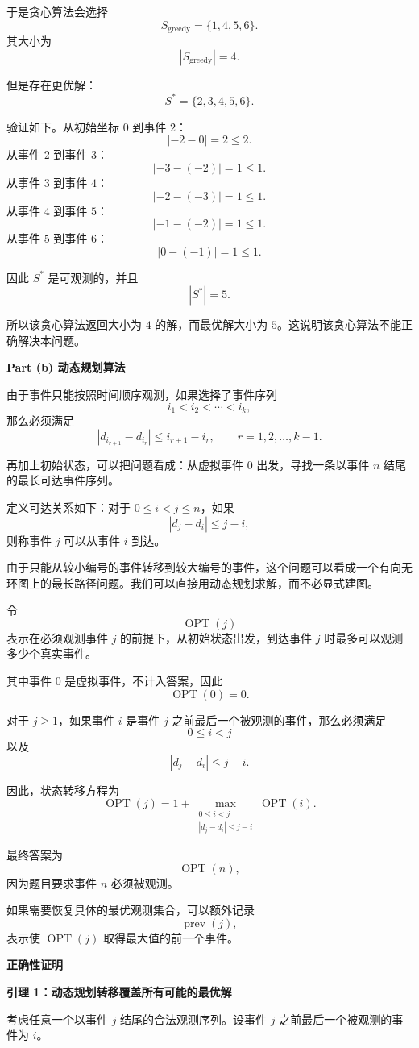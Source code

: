 \documentclass[12pt,a4paper]{article}
\begin{document}
\begin{answerbox}
于是贪心算法会选择
\[
S_{\text{greedy}}=\{1,4,5,6\}.
\]
其大小为
\[
|S_{\text{greedy}}|=4.
\]

但是存在更优解：
\[
S^*=\{2,3,4,5,6\}.
\]

验证如下。从初始坐标 $0$ 到事件 $2$：
\[
|-2-0|=2\le 2.
\]
从事件 $2$ 到事件 $3$：
\[
|-3-(-2)|=1\le 1.
\]
从事件 $3$ 到事件 $4$：
\[
|-2-(-3)|=1\le 1.
\]
从事件 $4$ 到事件 $5$：
\[
|-1-(-2)|=1\le 1.
\]
从事件 $5$ 到事件 $6$：
\[
|0-(-1)|=1\le 1.
\]

因此 $S^*$ 是可观测的，并且
\[
|S^*|=5.
\]

所以该贪心算法返回大小为 $4$ 的解，而最优解大小为 $5$。这说明该贪心算法不能正确解决本问题。

\textbf{Part (b) 动态规划算法}

由于事件只能按照时间顺序观测，如果选择了事件序列
\[
i_1<i_2<\cdots<i_k,
\]
那么必须满足
\[
|d_{i_{r+1}}-d_{i_r}|\le i_{r+1}-i_r,
\qquad r=1,2,\ldots,k-1.
\]

再加上初始状态，可以把问题看成：从虚拟事件 $0$ 出发，寻找一条以事件 $n$ 结尾的最长可达事件序列。

定义可达关系如下：对于 $0\le i<j\le n$，如果
\[
|d_j-d_i|\le j-i,
\]
则称事件 $j$ 可以从事件 $i$ 到达。

由于只能从较小编号的事件转移到较大编号的事件，这个问题可以看成一个有向无环图上的最长路径问题。我们可以直接用动态规划求解，而不必显式建图。

令
\[
\operatorname{OPT}(j)
\]
表示在必须观测事件 $j$ 的前提下，从初始状态出发，到达事件 $j$ 时最多可以观测多少个真实事件。

其中事件 $0$ 是虚拟事件，不计入答案，因此
\[
\operatorname{OPT}(0)=0.
\]

对于 $j\ge 1$，如果事件 $i$ 是事件 $j$ 之前最后一个被观测的事件，那么必须满足
\[
0\le i<j
\]
以及
\[
|d_j-d_i|\le j-i.
\]

因此，状态转移方程为
\[
\operatorname{OPT}(j)
=
1+
\max_{\substack{0\le i<j\\ |d_j-d_i|\le j-i}}
\operatorname{OPT}(i).
\]

最终答案为
\[
\operatorname{OPT}(n),
\]
因为题目要求事件 $n$ 必须被观测。

如果需要恢复具体的最优观测集合，可以额外记录
\[
\operatorname{prev}(j),
\]
表示使 $\operatorname{OPT}(j)$ 取得最大值的前一个事件。

\textbf{正确性证明}

\textbf{引理 1：动态规划转移覆盖所有可能的最优解}

考虑任意一个以事件 $j$ 结尾的合法观测序列。设事件 $j$ 之前最后一个被观测的事件为 $i$。


\end{answerbox}
\end{document}
